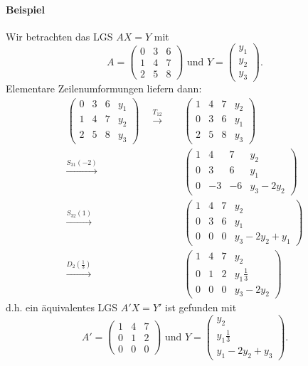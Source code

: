 \paragraph{Beispiel}
	Wir betrachten das LGS $ AX=Y $ mit 
	\[
            A = \begin{pmatrix}
		0 & 3 & 6\\
		1 & 4 & 7\\
		2 & 5 & 8
		\end{pmatrix}
		\text{ und }
		Y = \begin{pmatrix}
		y_1 \\ y_2 \\ y_3
		\end{pmatrix}. \]
	Elementare Zeilenumformungen liefern dann:
	\begin{align*}
	\begin{pmatrix}
		0 & 3 & 6 & y_1\\
		1 & 4 & 7 & y_2\\
		2 & 5 & 8 & y_3
	\end{pmatrix}\quad
	\overset{T_{12}}{\to}\quad
	&\begin{pmatrix}	
		1 & 4 & 7 & y_2\\
		0 & 3 & 6 & y_1\\
		2 & 5 & 8 & y_3
	\end{pmatrix}
	\\
	\overset{S_{31}(-2)}{\to}\quad
	&\begin{pmatrix}	
		1 & 4 & 7 & y_2\\
		0 & 3 & 6 & y_1\\
		0 & -3 & -6 & y_3-2y_2
	\end{pmatrix}\\
	\overset{S_{32}(1)}{\to}\quad
	&\begin{pmatrix}	
		1 & 4 & 7 & y_2\\
		0 & 3 & 6 & y_1\\
		0 & 0 & 0 & y_3-2y_2+y_1
	\end{pmatrix}\\
	\overset{D_2(\frac{1}{3})}{\to}\quad
	&\begin{pmatrix}	
		1 & 4 & 7 & y_2\\
		0 & 1 & 2 & y_1 \frac{1}{3}\\
		0 & 0 & 0 & y_3-2y_2
	\end{pmatrix}
	 \end{align*}
	 d.h. ein äquivalentes LGS $ A'X=Y' $ ist gefunden mit
	 	\[ A' = 
	 	\begin{pmatrix}	
	 		1 & 4 & 7 \\
	 		0 & 1 & 2 \\
	 		0 & 0 & 0 
	 	\end{pmatrix}
	 	\text{ und }
	 	Y = \begin{pmatrix}
	 	y_2 \\ y_1\frac{1}{3} \\ y_1-2y_2+y_3
	 	\end{pmatrix}.\]
